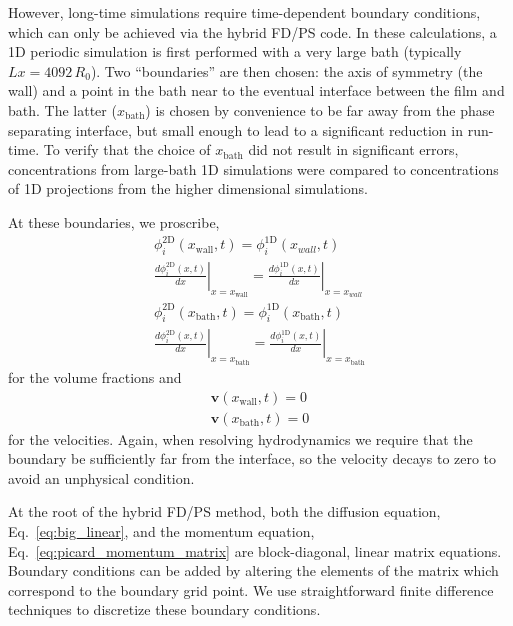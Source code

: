 \documentclass[journal=mamobx,manuscript=suppinfo]{achemso}
\newcommand{\twoD}{\mathrm{2D}}
\newcommand{\oneD}{\mathrm{1D}}
\newcommand{\wall}{\mathrm{wall}}
\newcommand{\bath}{\mathrm{bath}}
\begin{document}
However, long-time simulations require time-dependent boundary conditions, which can only be achieved via the hybrid FD/PS code.
In these calculations, a 1D periodic simulation is first performed with a very large bath (typically $Lx = 4092\, R_{0}$).
Two ``boundaries'' are then chosen: the axis of symmetry (the wall) and a point in the bath near to the eventual interface between the film and bath.
The latter ($x_{\bath}$) is chosen by convenience to be far away from the phase separating interface, but small enough to lead to a significant reduction in run-time.
To verify that the choice of $x_{\bath}$ did not result in significant errors, concentrations from large-bath 1D simulations were compared to concentrations of 1D projections from the higher dimensional simulations.

At these boundaries, we proscribe,
\begin{gather}
\phi_{i}^{\twoD}(x_{\wall}, t) = \phi_{i}^{\oneD}(x_{wall}, t) \\
\left . \frac{d \phi_{i}^{\twoD}(x,t)}{dx}\right |_{x=x_{\wall}} = \left . \frac{d \phi_{i}^{\oneD}(x,t)}{dx}\right |_{x=x_{wall}} \\
\phi_{i}^{\twoD}(x_{\bath}, t) = \phi_{i}^{\oneD}(x_{\bath}, t) \\
\left . \frac{d \phi_{i}^{\twoD}(x,t)}{dx}\right |_{x=x_{\bath}} = \left . \frac{d \phi_{i}^{\oneD}(x,t)}{dx}\right |_{x=x_{\bath}} 
\end{gather}
for the volume fractions and
\begin{gather}
\bm{v}(x_{\wall}, t) = 0 \\
\bm{v}(x_{\bath}, t) = 0
\end{gather}
for the velocities.
Again, when resolving hydrodynamics we require that the boundary be sufficiently far from the interface, so the velocity decays to zero to avoid an unphysical condition.

At the root of the hybrid FD/PS method, both the diffusion equation, Eq.~\ref{eq:big_linear}, and the momentum equation, Eq.~\ref{eq:picard_momentum_matrix} are block-diagonal, linear matrix equations.
Boundary conditions can be added by altering the elements of the matrix which correspond to the boundary grid point.
We use straightforward finite difference techniques to discretize these boundary conditions.
\end{document}
